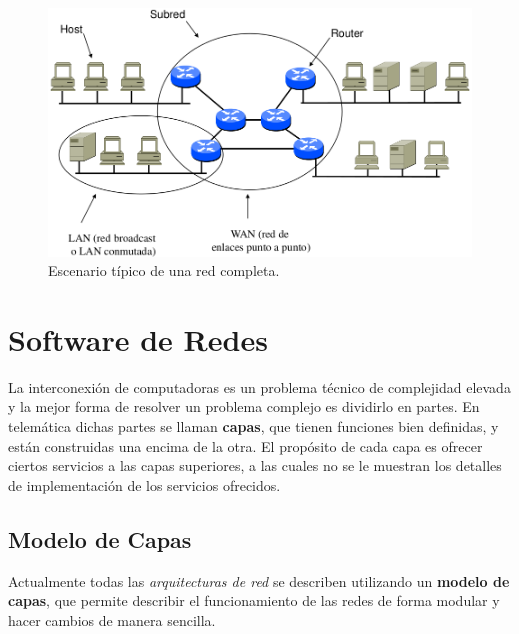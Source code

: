 \documentclass[10pt,a4paper]{article}
\begin{document}
\begin{figure}[ht!]
  \caption{Escenario típico de una red completa.}
  \label{fig:escenario_lan_wan}  
  \centerline{\includegraphics[width=0.7\textwidth-\fboxrule-\fboxrule]{imgs/escenario_lan_wan.png}}  
\end{figure}

\section{Software de Redes}

La interconexión de computadoras es un problema técnico de complejidad elevada y la mejor forma de resolver un problema complejo es dividirlo en partes. En telemática dichas partes se llaman \textbf{capas}, que tienen funciones bien definidas, y están construidas una encima de la otra. El propósito de cada capa es ofrecer ciertos servicios a las capas superiores, a las cuales no se le muestran los detalles de implementación de los servicios ofrecidos.

\subsection{Modelo de Capas}
Actualmente todas las \textit{arquitecturas de red} se describen utilizando un \textbf{modelo de capas}, que permite describir el funcionamiento de las redes de forma modular y hacer cambios de manera sencilla.
\end{document}
